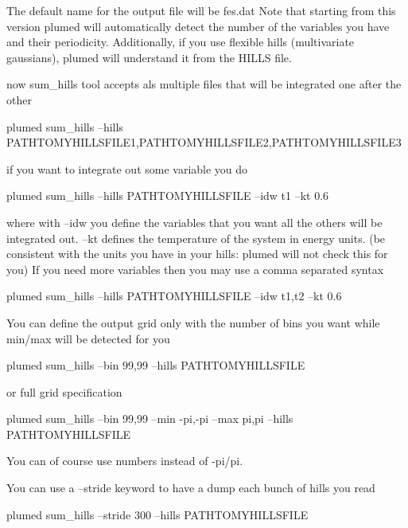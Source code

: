 The default name for the output file will be fes.\+dat Note that starting from this version plumed will automatically detect the number of the variables you have and their periodicity. Additionally, if you use flexible hills (multivariate gaussians), plumed will understand it from the H\+I\+L\+L\+S file.

now sum\+\_\+hills tool accepts als multiple files that will be integrated one after the other

\begin{DoxyVerb}plumed sum_hills  --hills PATHTOMYHILLSFILE1,PATHTOMYHILLSFILE2,PATHTOMYHILLSFILE3 
\end{DoxyVerb}


if you want to integrate out some variable you do

\begin{DoxyVerb}plumed sum_hills  --hills PATHTOMYHILLSFILE   --idw t1 --kt 0.6 
\end{DoxyVerb}


where with --idw you define the variables that you want all the others will be integrated out. --kt defines the temperature of the system in energy units. (be consistent with the units you have in your hills\+: plumed will not check this for you) If you need more variables then you may use a comma separated syntax

\begin{DoxyVerb}plumed sum_hills  --hills PATHTOMYHILLSFILE   --idw t1,t2 --kt 0.6  
\end{DoxyVerb}


You can define the output grid only with the number of bins you want while min/max will be detected for you

\begin{DoxyVerb}plumed sum_hills --bin 99,99 --hills PATHTOMYHILLSFILE   
\end{DoxyVerb}


or full grid specification

\begin{DoxyVerb}plumed sum_hills --bin 99,99 --min -pi,-pi --max pi,pi --hills PATHTOMYHILLSFILE   
\end{DoxyVerb}


You can of course use numbers instead of -\/pi/pi.

You can use a --stride keyword to have a dump each bunch of hills you read \begin{DoxyVerb}plumed sum_hills --stride 300 --hills PATHTOMYHILLSFILE   
\end{DoxyVerb}


